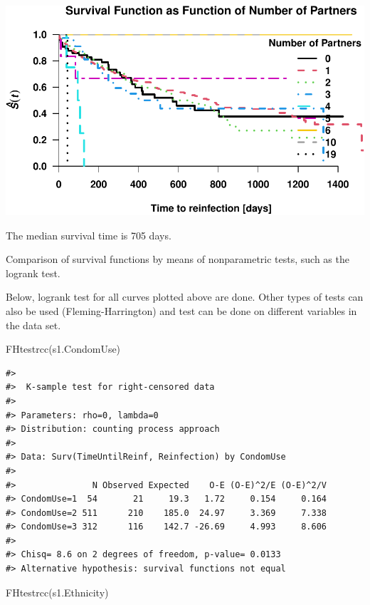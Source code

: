 \documentclass[
]{article}
\newenvironment{Shaded}{\begin{snugshade}}{\end{snugshade}}
\newcommand{\FunctionTok}[1]{\textcolor[rgb]{0.00,0.00,0.00}{#1}}
\newcommand{\NormalTok}[1]{#1}
\begin{document}
\includegraphics{practical_files/figure-latex/unnamed-chunk-11-1.pdf}

The median survival time is 705 days.

Comparison of survival functions by means of nonparametric tests, such as the logrank test.

Below, logrank test for all curves plotted above are done. Other types of tests can also be used (Fleming-Harrington) and test can be done on different variables in the data set.

\begin{Shaded}
\begin{Highlighting}[]
\FunctionTok{FHtestrcc}\NormalTok{(s1.CondomUse)}
\end{Highlighting}
\end{Shaded}

\begin{verbatim}
#> 
#>  K-sample test for right-censored data
#> 
#> Parameters: rho=0, lambda=0
#> Distribution: counting process approach
#> 
#> Data: Surv(TimeUntilReinf, Reinfection) by CondomUse
#> 
#>               N Observed Expected    O-E (O-E)^2/E (O-E)^2/V
#> CondomUse=1  54       21     19.3   1.72     0.154     0.164
#> CondomUse=2 511      210    185.0  24.97     3.369     7.338
#> CondomUse=3 312      116    142.7 -26.69     4.993     8.606
#> 
#> Chisq= 8.6 on 2 degrees of freedom, p-value= 0.0133
#> Alternative hypothesis: survival functions not equal
\end{verbatim}

\begin{Shaded}
\begin{Highlighting}[]
\FunctionTok{FHtestrcc}\NormalTok{(s1.Ethnicity)}
\end{Highlighting}
\end{Shaded}
\end{document}
